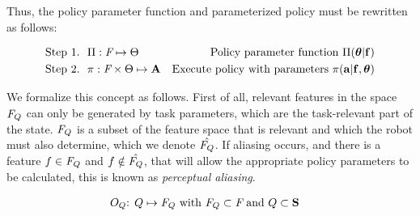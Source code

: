 \documentclass[12pt]{article}
\newcommand{\mymath}[1]{\ensuremath{#1}\xspace}
\newcommand{\pol}    {\mymath{\pi}}
\newcommand{\act}    {\mymath{\mathbf{a}}}
\newcommand{\actsp}  {\mymath{\mathbf{A}}}
\newcommand{\stasp}  {\mymath{\mathbf{S}}}
\newcommand{\app}    {\mymath{\bm{\theta}}}
\newcommand{\appsp}  {\mymath{\Theta}}
\newcommand{\polg}   {\mymath{\Pi}}
\newcommand{\taskpsp}{\mymath{Q}}
\newcommand{\feat}   {\mymath{f}}
\newcommand{\featv}  {\mymath{\mathbf{f}}}
\newcommand{\featsp} {\mymath{\emph{F}}}
\newcommand{\obsm}   {\mymath{O}}
\begin{document}
Thus, the policy parameter function and parameterized policy must be rewritten as follows: 

\begin{align}
\mbox{Step 1.~~}&\polg:\featsp\mapsto\appsp & \mbox{Policy parameter function~} \polg(\app|\featv)\label{eq:pol_par_fun}\\
\mbox{Step 2.~~}&\pol:\featsp\times\appsp\mapsto\actsp & \mbox{Execute policy with parameters~}  \pol(\act|\featv,\app)
\end{align}

We formalize this concept as follows.
First of all, relevant features in the space $\featsp_Q$ can only be generated by task parameters, which are the task-relevant part of the state. $\featsp_Q$ is a subset of the feature space that is relevant and which the robot must also determine, which we denote $\hat{\featsp_Q}$. If aliasing occurs, and there is a feature $\feat \in \featsp_Q$ and $\feat \notin \hat{\featsp_Q}$, that will allow the appropriate policy parameters to be calculated, this is known as \emph{perceptual aliasing}.

\begin{align}
\obsm_Q\mbox{: } &\label{eq:obs_task}\taskpsp \mapsto \featsp_Q \mbox{~with~} \featsp_Q \subset \featsp \mbox{~and~}  \taskpsp \subset \stasp
\end{align}


\end{document}
